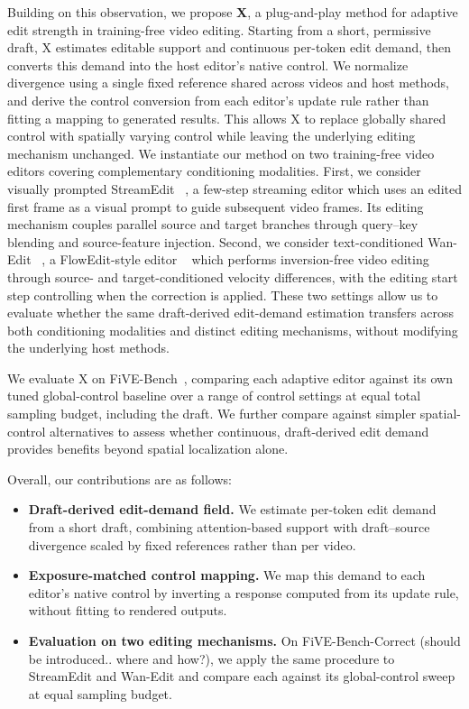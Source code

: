 Building on this observation, we propose \textbf{X}, a plug-and-play method for adaptive
edit strength in training-free video editing. Starting from a short, permissive draft, X estimates editable support and continuous per-token edit demand, then converts this demand into the host editor's native control.
We normalize divergence using a single fixed reference shared across videos and host methods, and derive
the control conversion from each editor's update rule rather than fitting a mapping to generated results. This allows X to replace globally shared control with spatially varying control while leaving the underlying editing mechanism unchanged. We instantiate our method on two training-free video editors covering complementary conditioning modalities. First, we consider visually prompted StreamEdit ~\cite{streamedit2026}, a few-step streaming editor which uses an edited first frame as a visual prompt to guide subsequent video frames. Its editing mechanism couples parallel source and target branches through query--key blending and source-feature injection. Second, we consider text-conditioned Wan-Edit ~\cite{five2025}, a FlowEdit-style editor ~\cite{flowedit} which performs inversion-free video editing through source- and target-conditioned velocity differences, with the editing start step controlling when the correction is applied. These two settings allow us to evaluate whether the same draft-derived edit-demand estimation transfers across both conditioning modalities and distinct editing mechanisms, without modifying the underlying host methods.

We evaluate X on FiVE-Bench~\cite{five2025}, comparing each adaptive editor against its own tuned global-control baseline over a range of control settings at equal total sampling budget, including the draft. We further compare against simpler spatial-control alternatives to assess whether continuous, draft-derived edit demand
provides benefits beyond spatial localization alone.

Overall, our contributions are as follows:
\begin{itemize}
    \item \textbf{Draft-derived edit-demand field.}
    We estimate per-token edit demand from a short draft, combining attention-based support with draft--source divergence scaled by fixed references rather than per video.
    \item \textbf{Exposure-matched control mapping.}
    We map this demand to each editor's native control by inverting a response computed from its update rule, without fitting to rendered outputs.
    \item \textbf{Evaluation on two editing mechanisms.}
    On FiVE-Bench-Correct (should be introduced.. where and how?), we apply the same procedure to StreamEdit
    and Wan-Edit and compare each against its global-control sweep at equal sampling budget.
\end{itemize}